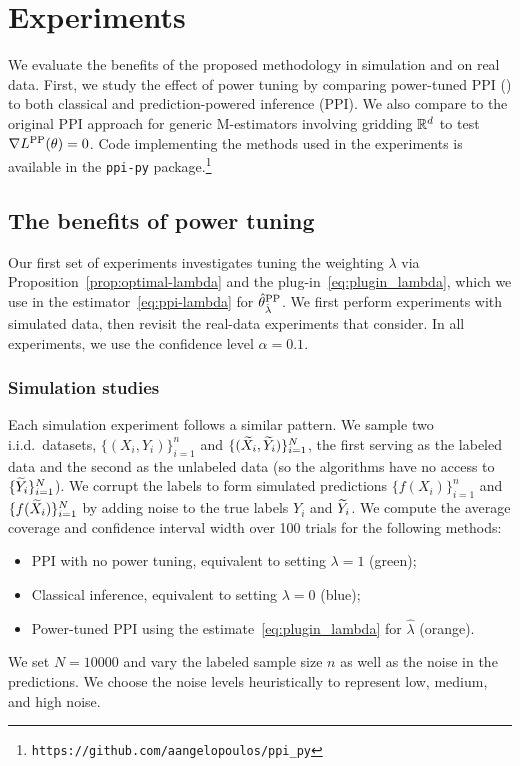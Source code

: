 
\section{Experiments}
\label{sec:experiments}

We evaluate the benefits of the proposed methodology in simulation and on
real data. First, we study the effect of power tuning by comparing
power-tuned PPI (\ppipp) to both classical and prediction-powered inference
(PPI). We also compare to the original PPI approach for generic M-estimators
involving gridding $\mathbb{R}^d$ to test $\nabla L^{\mathrm{PP}}(\theta) = 0$. Code implementing the \ppipp methods used in the experiments is available in the \texttt{ppi-py} package.\footnote{\texttt{https://github.com/aangelopoulos/ppi\_py}}


\subsection{The benefits of power tuning}

Our first set of experiments investigates tuning the weighting $\lambda$ via
Proposition~\ref{prop:optimal-lambda} and the
plug-in~\eqref{eq:plugin_lambda}, which we use in the
estimator~\eqref{eq:ppi-lambda} for $\hat{\theta}^{\mathrm{PP}}_{\hat{\lambda}}$. We first
perform experiments with simulated data, then revisit the
real-data experiments that \citet{AngelopoulosBaFaJoZr23} consider.
In all experiments, we use the confidence level $\alpha=0.1$.

\subsubsection{Simulation studies}
\label{sec:simulations}

Each simulation experiment follows a similar pattern.
%
We sample two i.i.d.\ datasets, $\{(X_i,Y_i)\}_{i=1}^n$ and $\{(\widetilde{X}_i,
\widetilde{Y}_i)\}_{i=1}^N$, the first serving as the labeled data and the second as
the unlabeled data (so the algorithms have no access to
$\{\widetilde{Y}_i\}_{i=1}^N$).
%
We corrupt the labels to form simulated predictions $\{f(X_i)\}_{i=1}^n$ and
$\{f(\widetilde{X}_i)\}_{i=1}^N$ by adding noise to the true labels $Y_i$ and
$\widetilde{Y}_i$.
%
We compute the average coverage and confidence interval width over 100 trials for the following methods:
\begin{itemize}
\item PPI with no power tuning, equivalent to setting $\lambda=1$ (green);
\item Classical inference, equivalent to setting $\lambda=0$ (blue);
\item Power-tuned PPI using the estimate~\eqref{eq:plugin_lambda}
  for $\hat{\lambda}$ (orange).
\end{itemize}
We set $N=10000$ and vary the labeled sample size $n$
as well as the noise in the predictions.
%
We choose the noise levels heuristically to represent low, medium, and high noise.

